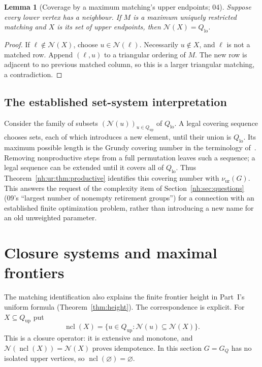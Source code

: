 \documentclass[11pt,a4paper]{article}
\newtheorem{lemma}[theorem]{Lemma}
\theoremstyle{definition}
\theoremstyle{remark}
\newcommand{\Qlo}{Q_{\mathrm{lo}}}
\newcommand{\Qup}{Q_{\mathrm{up}}}
\newcommand{\Nb}{\mathcal N}
\newcommand{\nuur}{\nu_{\mathrm{ur}}}
\newcommand{\ncl}{\operatorname{ncl}}
\begin{document}
\begin{lemma}[Coverage by a maximum matching's upper endpoints; 04]
\label{nh:ur:lem:coverage}
Suppose every lower vertex has a neighbour. If $M$ is a maximum uniquely
restricted matching and $X$ is its set of upper endpoints, then
$\Nb(X)=\Qlo$.
\end{lemma}
\begin{proof}
If $\ell\notin\Nb(X)$, choose $u\in\Nb(\ell)$. Necessarily $u\notin X$, and
$\ell$ is not a matched row. Append $(\ell,u)$ to a triangular ordering of
$M$. The new row is adjacent to no previous matched column, so this is a larger
triangular matching, a contradiction.
\end{proof}

\subsection{The established set-system interpretation}\label{nh:ur:sec:grundy}
Consider the family of subsets $(\Nb(u))_{u\in\Qup}$ of $\Qlo$. A legal
covering sequence chooses sets, each of which introduces a new element, until
their union is $\Qlo$. Its maximum possible length is the Grundy covering
number in the terminology of~\cite{BHR2016}. Removing nonproductive steps
from a full permutation leaves such a sequence; a legal sequence can be
extended until it covers all of $\Qlo$. Thus
Theorem~\ref{nh:ur:thm:productive} identifies this covering number with
$\nuur(G)$. This answers the request of the complexity item of
Section~\ref{nh:sec:questions} (09's ``largest number of nonempty retirement
groups'') for a connection with an established finite optimization problem,
rather than introducing a new name for an old unweighted parameter.

\section{Closure systems and maximal frontiers}\label{nh:ur:sec:closure}
\setcounter{equation}{0}

The matching identification also explains the finite frontier height in
Part~I's uniform formula (Theorem~\ref{thm:height}). The correspondence is
explicit. For $X\subseteq\Qup$ put
\begin{equation}\label{nh:ur:eq:closure}
 \ncl(X)=\{u\in\Qup:\Nb(u)\subseteq\Nb(X)\}.
\end{equation}
This is a closure operator: it is extensive and monotone, and
$\Nb(\ncl(X))=\Nb(X)$ proves idempotence. In this section $G=G_Q$ has no
isolated upper vertices, so $\ncl(\varnothing)=\varnothing$.
\end{document}
